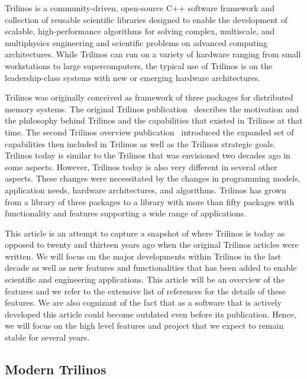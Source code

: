 
Trilinos is a community-driven, open-source C++ software framework and collection of reusable scientific libraries designed to enable the development of scalable, high-performance algorithms for solving complex, multiscale, and multiphysics engineering and scientific problems on advanced computing architectures.
While Trilinos can run on a variety of hardware ranging from small workstations to large supercomputers, the typical use of Trilinos is on the leadership-class systems with new or emerging hardware architectures.

Trilinos was originally conceived as framework of three packages for distributed memory systems. The original Trilinos publication~\cite{Heroux2005a} describes the motivation and the philosophy behind Trilinos and the capabilities that existed in Trilinos at that time. The second Trilinos overview publication~\cite{Heroux2012} introduced the expanded set of capabilities then included in Trilinos as well as the Trilinos strategic goals. Trilinos today is similar to the Trilinos that was envisioned two decades ago in some aspects. However, Trilinos today is also very different in several other aspects. These changes were necessitated by the changes in programming models, application needs, hardware architectures, and algorithms. Trilinos has grown from a library of three packages to a library with more than fifty packages with functionality and features supporting a wide range of applications.

This article is an attempt to capture a snapshot of where Trilinos is today as opposed to twenty and thirteen years ago when the original Trilinos articles were written. We will focus on the major developments within Trilinos in the last decade as well as new features and functionalities that has been added to enable scientific and engineering applications. This article will be an overview of the features and we refer to the extensive list of references for the details of these features. We are also cognizant of the fact that as a software that is actively developed this article could become outdated even before its publication. Hence, we will focus on the high level features and project that we expect to remain stable for several years.



\subsection{Modern Trilinos}

